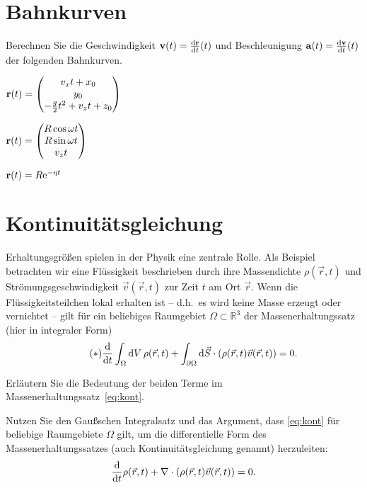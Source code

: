 \documentclass{scrartcl}
\begin{document}
\section{Bahnkurven}
\label{sec:bahnkurven}

Berechnen Sie die Geschwindigkeit $\mat v(t) = \deriv[\mat r]{t}(t)$ und Beschleunigung $\mat a(t) = \deriv[\mat v]{t}(t)$ der folgenden Bahnkurven.\\

\begin{subex*}
  \item $\mat r(t) = \colvec{v_x t + x_0 \\ y_0 \\ -\frac{g}{2} t^2 + v_z t + z_0}$
  \item $\mat r(t) = \colvec{R \cos \omega t \\ R \sin \omega t \\ v_z t}$
  \item $\mat r(t) = R \mathrm{e}^{-\eta t}$  
\end{subex*}




\section{Kontinuitätsgleichung}
\label{sec:kontinuit_tsgleichung}

Erhaltungsgrößen spielen in der Physik eine zentrale Rolle.
Als Beispiel betrachten wir eine Flüssigkeit beschrieben durch ihre Massendichte $\rho(\vec r, t)$ und Strömungsgeschwindigkeit $\vec v(\vec r, t)$ zur Zeit $t$ am Ort $\vec r$.
Wenn die Flüssigkeitsteilchen lokal erhalten ist -- d.h.\ es wird keine Masse erzeugt oder vernichtet -- gilt für ein beliebiges Raumgebiet $\Omega \subset \mathbb{R}^3$ der Massenerhaltungssatz (hier in integraler Form)
\[
  \label{eq:kont}
  \tag{$\ast$}
  \deriv{t} \int_\Omega \dd V \, \rho(\vec r, t) + \int_{\partial \Omega} \dd \vec{S} \cdot \left( \rho(\vec r, t) \vec v(\vec r, t) \right) = 0.
\]

\begin{subex}
  \item Erläutern Sie die Bedeutung der beiden Terme im Massenerhaltungssatz~\eqref{eq:kont}.
  \item Nutzen Sie den Gaußschen Integralsatz und das Argument, dass \eqref{eq:kont} für beliebige Raumgebiete $\Omega$ gilt, um die differentielle Form des Massenerhaltungssatzes (auch Kontinuitätsgleichung genannt) herzuleiten:
  \[
    \deriv{t} \rho(\vec r, t) + \nabla \cdot (\rho(\vec r, t) \vec{v}(\vec r, t)) = 0.
  \] 
\end{subex}
\end{document}
